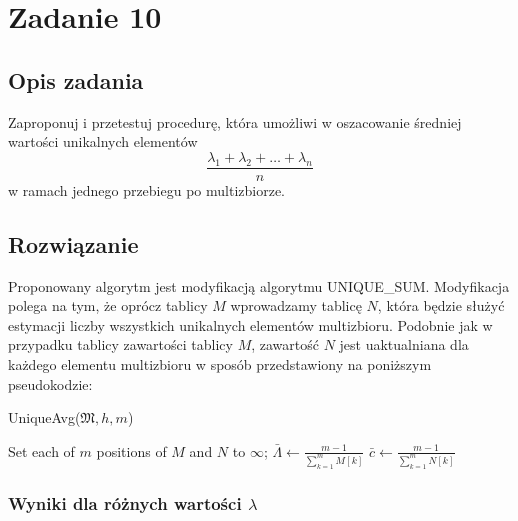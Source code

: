 \documentclass{article}
\newenvironment{pseudokod}[1][htb]{
	\renewcommand{\algorithmcfname}{}
	\begin{algorithm}[#1]%
	}{
\end{algorithm}
}
\begin{document}
	\section{Zadanie 10}
	\subsection{Opis zadania}
        Zaproponuj i przetestuj procedurę, która umożliwi w oszacowanie średniej wartości unikalnych elementów 
        $$\frac{\lambda_1 + \lambda_2 + \dots + \lambda_n}{n}$$ w ramach jednego przebiegu po multizbiorze.

    
    \subsection{Rozwiązanie}

    Proponowany algorytm jest modyfikacją algorytmu UNIQUE\_SUM. Modyfikacja polega na tym, że oprócz tablicy 
    $M$ wprowadzamy tablicę $N$, która będzie służyć estymacji liczby wszystkich unikalnych elementów multizbioru. 
    Podobnie jak w przypadku tablicy zawartości tablicy $M$, zawartość $N$ jest uaktualniana dla każdego elementu 
    multizbioru w sposób przedstawiony na poniższym pseudokodzie:
    \\

    \begin{pseudokod}[H]
        \caption{UniqueAvg($\mathfrak{M}, h, m$)}
        \BlankLine
        Set each of $m$ positions of $M$ and $N$ to $\infty$;
        \BlankLine
         {
        }
        $\bar{\Lambda} \gets \frac{m-1}{\sum_{k=1}^{m}M[k]}$\;
        $\bar{c} \gets \frac{m-1}{\sum_{k=1}^{m}N[k]}$\;

    \end{pseudokod}

    \subsubsection{Wyniki dla różnych wartości $\lambda$}
\end{document}
